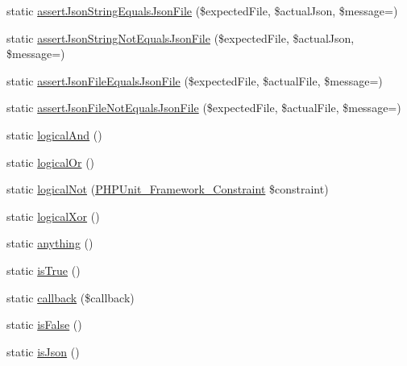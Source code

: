 \begin{DoxyCompactItemize}
\item 
static \mbox{\hyperlink{class_p_h_p_unit___framework___assert_a2649140bf9bf8938f80ec726e542a9bd}{assert\+Json\+String\+Equals\+Json\+File}} (\$expected\+File, \$actual\+Json, \$message=\textquotesingle{}\textquotesingle{})
\item 
static \mbox{\hyperlink{class_p_h_p_unit___framework___assert_a90090f060dd0a04bd3c153bd93ed090a}{assert\+Json\+String\+Not\+Equals\+Json\+File}} (\$expected\+File, \$actual\+Json, \$message=\textquotesingle{}\textquotesingle{})
\item 
static \mbox{\hyperlink{class_p_h_p_unit___framework___assert_a82198c472a4757d93961fdcb8285ab9c}{assert\+Json\+File\+Equals\+Json\+File}} (\$expected\+File, \$actual\+File, \$message=\textquotesingle{}\textquotesingle{})
\item 
static \mbox{\hyperlink{class_p_h_p_unit___framework___assert_a550ca587d626335d184f2d325ef59570}{assert\+Json\+File\+Not\+Equals\+Json\+File}} (\$expected\+File, \$actual\+File, \$message=\textquotesingle{}\textquotesingle{})
\item 
static \mbox{\hyperlink{class_p_h_p_unit___framework___assert_af486c1f325181cf5b4544706b72a32de}{logical\+And}} ()
\item 
static \mbox{\hyperlink{class_p_h_p_unit___framework___assert_aca8dbf2226f89dff5940fb65d716a060}{logical\+Or}} ()
\item 
static \mbox{\hyperlink{class_p_h_p_unit___framework___assert_a488f6835021a96f3b5f9b314d08fe3e2}{logical\+Not}} (\mbox{\hyperlink{class_p_h_p_unit___framework___constraint}{P\+H\+P\+Unit\+\_\+\+Framework\+\_\+\+Constraint}} \$constraint)
\item 
static \mbox{\hyperlink{class_p_h_p_unit___framework___assert_a0f77135dbe17ae91c6d9a47cd614d05d}{logical\+Xor}} ()
\item 
static \mbox{\hyperlink{class_p_h_p_unit___framework___assert_add735b7ec3aa72ba4f692c82df884ed1}{anything}} ()
\item 
static \mbox{\hyperlink{class_p_h_p_unit___framework___assert_aec0d388399b30713c0f555e4939f8f68}{is\+True}} ()
\item 
static \mbox{\hyperlink{class_p_h_p_unit___framework___assert_a9071a07cb9c8a581f500c46731151b0a}{callback}} (\$callback)
\item 
static \mbox{\hyperlink{class_p_h_p_unit___framework___assert_ad9c918506615e9b2507e0bc9d70add8b}{is\+False}} ()
\item 
static \mbox{\hyperlink{class_p_h_p_unit___framework___assert_a41ac5e3bef6aa36256a212ec69f04905}{is\+Json}} ()

\end{DoxyCompactItemize}
